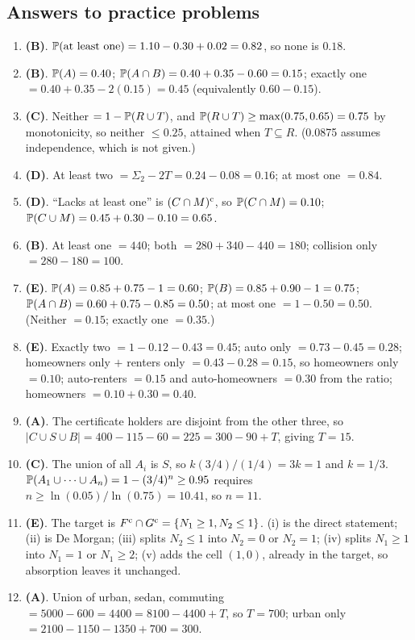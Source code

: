 \subsection{Answers to practice problems}

\begin{enumerate}[nosep,label=\textbf{\arabic*.}]
  \item \textbf{(B)}. $\mathbb{P}(\text{at least one}) = 1.10 - 0.30 + 0.02 = 0.82$,
        so none is $0.18$.
  \item \textbf{(B)}. $\mathbb{P}(A) = 0.40$; $\mathbb{P}(A\cap B) = 0.40 + 0.35 - 0.60 = 0.15$;
        exactly one $= 0.40 + 0.35 - 2(0.15) = 0.45$ (equivalently $0.60 - 0.15$).
  \item \textbf{(C)}. Neither $= 1 - \mathbb{P}(R \cup T)$, and $\mathbb{P}(R \cup T) \ge \max(0.75, 0.65) = 0.75$
        by monotonicity, so neither $\le 0.25$, attained when $T \subseteq R$.
        (0.0875 assumes independence, which is not given.)
  \item \textbf{(D)}. At least two $= \Sigma_2 - 2T = 0.24 - 0.08 = 0.16$; at most one $= 0.84$.
  \item \textbf{(D)}. ``Lacks at least one'' is $(C \cap M)^{\mathrm{c}}$, so $\mathbb{P}(C \cap M) = 0.10$;
        $\mathbb{P}(C \cup M) = 0.45 + 0.30 - 0.10 = 0.65$.
  \item \textbf{(B)}. At least one $= 440$; both $= 280 + 340 - 440 = 180$;
        collision only $= 280 - 180 = 100$.
  \item \textbf{(E)}. $\mathbb{P}(A) = 0.85 + 0.75 - 1 = 0.60$; $\mathbb{P}(B) = 0.85 + 0.90 - 1 = 0.75$;
        $\mathbb{P}(A \cap B) = 0.60 + 0.75 - 0.85 = 0.50$; at most one $= 1 - 0.50 = 0.50$.
        (Neither $= 0.15$; exactly one $= 0.35$.)
  \item \textbf{(E)}. Exactly two $= 1 - 0.12 - 0.43 = 0.45$; auto only $= 0.73 - 0.45 = 0.28$;
        homeowners only $+$ renters only $= 0.43 - 0.28 = 0.15$, so homeowners only $= 0.10$;
        auto-renters $= 0.15$ and auto-homeowners $= 0.30$ from the ratio;
        homeowners $= 0.10 + 0.30 = 0.40$.
  \item \textbf{(A)}. The certificate holders are disjoint from the other three, so
        $|C \cup S \cup B| = 400 - 115 - 60 = 225 = 300 - 90 + T$, giving $T = 15$.
  \item \textbf{(C)}. The union of all $A_i$ is $S$, so $k(3/4)/(1/4) = 3k = 1$ and $k = 1/3$.
        $\mathbb{P}(A_1 \cup \cdots \cup A_n) = 1 - (3/4)^n \ge 0.95$ requires
        $n \ge \ln(0.05)/\ln(0.75) = 10.41$, so $n = 11$.
  \item \textbf{(E)}. The target is $F^{\mathrm{c}} \cap G^{\mathrm{c}} = \{N_1 \ge 1, N_2 \le 1\}$.
        (i) is the direct statement; (ii) is De Morgan; (iii) splits $N_2 \le 1$ into
        $N_2 = 0$ or $N_2 = 1$; (iv) splits $N_1 \ge 1$ into $N_1 = 1$ or $N_1 \ge 2$;
        (v) adds the cell $(1, 0)$, already in the target, so absorption leaves it unchanged.
  \item \textbf{(A)}. Union of urban, sedan, commuting $= 5000 - 600 = 4400 = 8100 - 4400 + T$,
        so $T = 700$; urban only $= 2100 - 1150 - 1350 + 700 = 300$.
\end{enumerate}

